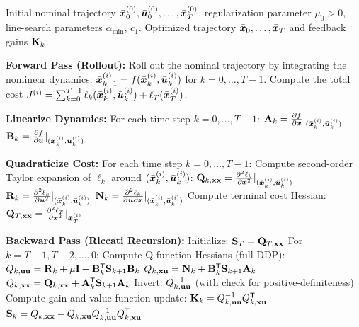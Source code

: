 \begin{algorithm}[H]
\caption{Differential Dynamic Programming (Full)}
\label{alg:ch5:ddp}
\begin{algorithmic}[1]
\Require Initial nominal trajectory $\bar{\bm{x}}_0^{(0)}, \bar{\bm{u}}_0^{(0)}, \ldots, \bar{\bm{x}}_T^{(0)}$,
         regularization parameter $\mu_0 > 0$, line-search parameters $\alpha_{\min}$, $c_1$.
\Ensure Optimized trajectory $\bar{\bm{x}}_0, \ldots, \bar{\bm{x}}_T$ and feedback gains $\mathbf{K}_k$.

  \State \textbf{Forward Pass (Rollout):}
  \State \quad Roll out the nominal trajectory by integrating the nonlinear dynamics:
  \State \quad \quad $\bar{\bm{x}}_{k+1}^{(i)} = f(\bar{\bm{x}}_k^{(i)}, \bar{\bm{u}}_k^{(i)})$ for $k = 0, \ldots, T-1$.
  \State \quad Compute the total cost $J^{(i)} = \sum_{k=0}^{T-1} \ell_k(\bar{\bm{x}}_k^{(i)}, \bar{\bm{u}}_k^{(i)}) + \ell_T(\bar{\bm{x}}_T^{(i)})$.

  \State \textbf{Linearize Dynamics:}
  \State \quad For each time step $k = 0, \ldots, T-1$:
  \State \quad \quad $\mathbf{A}_k = \frac{\partial f}{\partial \bm{x}}|_{(\bar{\bm{x}}_k^{(i)}, \bar{\bm{u}}_k^{(i)})}$
  \State \quad \quad $\mathbf{B}_k = \frac{\partial f}{\partial \bm{u}}|_{(\bar{\bm{x}}_k^{(i)}, \bar{\bm{u}}_k^{(i)})}$

  \State \textbf{Quadraticize Cost:}
  \State \quad For each time step $k = 0, \ldots, T-1$:
  \State \quad \quad Compute second-order Taylor expansion of $\ell_k$ around $(\bar{\bm{x}}_k^{(i)}, \bar{\bm{u}}_k^{(i)})$:
  \State \quad \quad \quad $\mathbf{Q}_{k,\mathbf{x}\mathbf{x}} = \frac{\partial^2 \ell_k}{\partial \bm{x}^2}|_{(\bar{\bm{x}}_k^{(i)}, \bar{\bm{u}}_k^{(i)})}$
  \State \quad \quad \quad $\mathbf{R}_k = \frac{\partial^2 \ell_k}{\partial \bm{u}^2}|_{(\bar{\bm{x}}_k^{(i)}, \bar{\bm{u}}_k^{(i)})}$
  \State \quad \quad \quad $\mathbf{N}_k = \frac{\partial^2 \ell_k}{\partial \bm{u} \partial \bm{x}}|_{(\bar{\bm{x}}_k^{(i)}, \bar{\bm{u}}_k^{(i)})}$
  \State \quad Compute terminal cost Hessian: $\mathbf{Q}_{T,\mathbf{x}\mathbf{x}} = \frac{\partial^2 \ell_T}{\partial \bm{x}^2}|_{\bar{\bm{x}}_T^{(i)}}$

  \State \textbf{Backward Pass (Riccati Recursion):}
  \State \quad Initialize: $\mathbf{S}_T = \mathbf{Q}_{T,\mathbf{x}\mathbf{x}}$
  \State \quad For $k = T-1, T-2, \ldots, 0$:
  \State \quad \quad Compute Q-function Hessians (full DDP):
  \State \quad \quad \quad $Q_{k,\mathbf{u}\mathbf{u}} = \mathbf{R}_k + \mu\mathbf{I} + \mathbf{B}_k^{\mathsf{T}}\mathbf{S}_{k+1}\mathbf{B}_k$
  \State \quad \quad \quad $Q_{k,\mathbf{x}\mathbf{u}} = \mathbf{N}_k + \mathbf{B}_k^{\mathsf{T}}\mathbf{S}_{k+1}\mathbf{A}_k$
  \State \quad \quad \quad $Q_{k,\mathbf{x}\mathbf{x}} = \mathbf{Q}_{k,\mathbf{x}\mathbf{x}} + \mathbf{A}_k^{\mathsf{T}}\mathbf{S}_{k+1}\mathbf{A}_k$
  \State \quad \quad Invert:
  \State \quad \quad \quad $Q_{k,\mathbf{u}\mathbf{u}}^{-1}$ (with check for positive-definiteness)
  \State \quad \quad Compute gain and value function update:
  \State \quad \quad \quad $\mathbf{K}_k = Q_{k,\mathbf{u}\mathbf{u}}^{-1}Q_{k,\mathbf{x}\mathbf{u}}^{\mathsf{T}}$
  \State \quad \quad \quad $\mathbf{S}_k = Q_{k,\mathbf{x}\mathbf{x}} - Q_{k,\mathbf{x}\mathbf{u}}Q_{k,\mathbf{u}\mathbf{u}}^{-1}Q_{k,\mathbf{x}\mathbf{u}}^{\mathsf{T}}$
  \EndFor


\end{algorithmic}
\end{algorithm}
